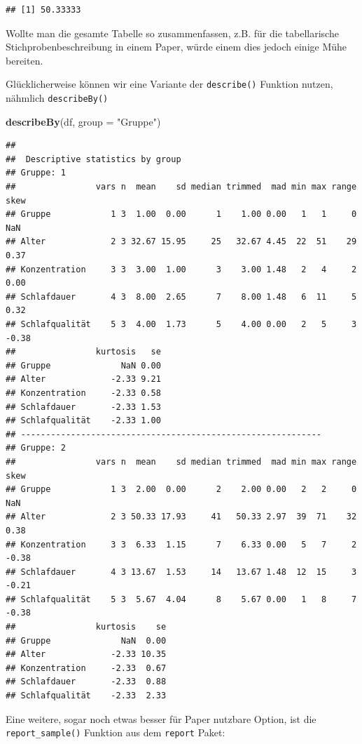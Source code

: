 \documentclass[
]{book}
\newenvironment{Shaded}{\begin{snugshade}}{\end{snugshade}}
\newcommand{\AttributeTok}[1]{\textcolor[rgb]{0.13,0.29,0.53}{#1}}
\newcommand{\FunctionTok}[1]{\textcolor[rgb]{0.13,0.29,0.53}{\textbf{#1}}}
\newcommand{\NormalTok}[1]{#1}
\newcommand{\StringTok}[1]{\textcolor[rgb]{0.31,0.60,0.02}{#1}}
\begin{document}
\begin{verbatim}
## [1] 50.33333
\end{verbatim}

Wollte man die gesamte Tabelle so zusammenfassen, z.B. für die tabellarische Stichprobenbeschreibung in einem Paper, würde einem dies jedoch einige Mühe bereiten.

Glücklicherweise können wir eine Variante der \texttt{describe()} Funktion nutzen, nähmlich \texttt{describeBy()}

\begin{Shaded}
\begin{Highlighting}[]
\FunctionTok{describeBy}\NormalTok{(df, }\AttributeTok{group =} \StringTok{"Gruppe"}\NormalTok{)}
\end{Highlighting}
\end{Shaded}

\begin{verbatim}
## 
##  Descriptive statistics by group 
## Gruppe: 1
##                vars n  mean    sd median trimmed  mad min max range  skew
## Gruppe            1 3  1.00  0.00      1    1.00 0.00   1   1     0   NaN
## Alter             2 3 32.67 15.95     25   32.67 4.45  22  51    29  0.37
## Konzentration     3 3  3.00  1.00      3    3.00 1.48   2   4     2  0.00
## Schlafdauer       4 3  8.00  2.65      7    8.00 1.48   6  11     5  0.32
## Schlafqualität    5 3  4.00  1.73      5    4.00 0.00   2   5     3 -0.38
##                kurtosis   se
## Gruppe              NaN 0.00
## Alter             -2.33 9.21
## Konzentration     -2.33 0.58
## Schlafdauer       -2.33 1.53
## Schlafqualität    -2.33 1.00
## ------------------------------------------------------------ 
## Gruppe: 2
##                vars n  mean    sd median trimmed  mad min max range  skew
## Gruppe            1 3  2.00  0.00      2    2.00 0.00   2   2     0   NaN
## Alter             2 3 50.33 17.93     41   50.33 2.97  39  71    32  0.38
## Konzentration     3 3  6.33  1.15      7    6.33 0.00   5   7     2 -0.38
## Schlafdauer       4 3 13.67  1.53     14   13.67 1.48  12  15     3 -0.21
## Schlafqualität    5 3  5.67  4.04      8    5.67 0.00   1   8     7 -0.38
##                kurtosis    se
## Gruppe              NaN  0.00
## Alter             -2.33 10.35
## Konzentration     -2.33  0.67
## Schlafdauer       -2.33  0.88
## Schlafqualität    -2.33  2.33
\end{verbatim}

Eine weitere, sogar noch etwas besser für Paper nutzbare Option, ist die \texttt{report\_sample()} Funktion aus dem \texttt{report} Paket:
\end{document}

